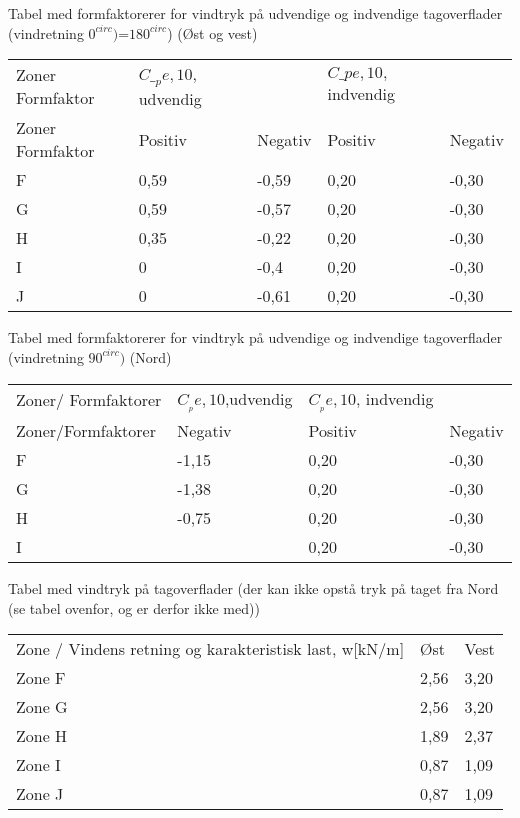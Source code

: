 Tabel med formfaktorerer for vindtryk på udvendige og indvendige tagoverflader (vindretning $0^{circ})$=$180^{circ}$) (Øst og vest)

\begin{table}[h]
\begin{tabular}{lllll}
Zoner Formfaktor & $C\__pe,10$, udvendig &         & $C\_pe,10,$indvendig &         \\
Zoner Formfaktor & Positiv             & Negativ & Positiv             & Negativ \\
F                & 0,59                & -0,59   & 0,20                 & -0,30    \\
G                & 0,59                & -0,57   & 0,20                 & -0,30    \\
H                & 0,35                & -0,22   & 0,20                 & -0,30    \\
I                & 0                   & -0,4    & 0,20                 & -0,30    \\
J                & 0                   & -0,61   & 0,20                 & -0,30   
\end{tabular}
\end{table}


Tabel med formfaktorerer for vindtryk på udvendige og indvendige tagoverflader (vindretning $90^{circ})$ (Nord)

\begin{table}[h]
	\begin{tabular}{llll}
		Zoner/ Formfaktorer & $C__pe,10$,udvendig & $C__pe,10$, indvendig &         \\
		Zoner/Formfaktorer  & Negativ             & Positiv               & Negativ \\
		F                   & -1,15               & 0,20                  & -0,30   \\
		G                   & -1,38               & 0,20                  & -0,30   \\
		H                   & -0,75               & 0,20                  & -0,30   \\
		I                   &                     & 0,20                  & -0,30  
	\end{tabular}
\end{table}


Tabel med vindtryk på tagoverflader (der kan ikke opstå tryk på taget fra Nord (se tabel ovenfor, og er derfor ikke med))
\begin{table}[h]
	\begin{tabular}{lll}
		Zone / Vindens retning og karakteristisk last, w{[}kN/m{]} & Øst  & Vest \\
		Zone F                                                     & 2,56 & 3,20 \\
		Zone G                                                     & 2,56 & 3,20 \\
		Zone H                                                     & 1,89 & 2,37 \\
		Zone I                                                     & 0,87 & 1,09 \\
		Zone J                                                     & 0,87 & 1,09
	\end{tabular}
\end{table}

